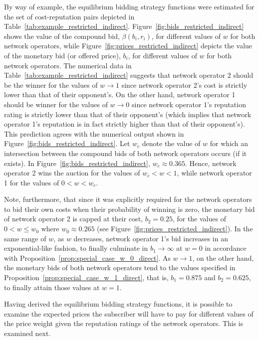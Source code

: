 By way of example, the equilibrium bidding strategy functions were estimated for the set of cost-reputation pairs depicted in Table~\ref{tab:example_restricted_indirect}. Figure~\ref{fig:bids_restricted_indirect} shows the value of the compound bid, $\beta(b_i,r_i)$, for different values of $w$ for both network operators, while Figure~\ref{fig:prices_restricted_indirect} depicts the value of the monetary bid (or offered price), $b_i$, for different values of $w$ for both network operators. The numerical data in Table~\ref{tab:example_restricted_indirect} suggests that network operator 2 should be the winner for the values of $w\rightarrow 1$ since network operator 2's cost is strictly lower than that of their opponent's. On the other hand, network operator 1 should be winner for the values of $w\rightarrow 0$ since network operator 1's reputation rating is strictly lower than that of their opponent's (which implies that network operator 1's reputation is in fact strictly higher than that of their opponent's). This prediction agrees with the numerical output shown in Figure~\ref{fig:bids_restricted_indirect}. Let $w_c$ denote the value of $w$ for which an intersection between the compound bids of both network operators occurs (if it exists). In Figure~\ref{fig:bids_restricted_indirect}, $w_c\approx 0.365$. Hence, network operator 2 wins the auction for the values of $w_c < w < 1$, while network operator 1 for the values of $0 < w < w_c$.

Note, furthermore, that since it was explicitly required for the network operators to bid their own costs when their probability of winning is zero, the monetary bid of network operator 2 is capped at their cost, $b_2 = 0.25$, for the values of $0 < w \le w_0$ where $w_0\approx 0.265$ (see Figure~\ref{fig:prices_restricted_indirect}). In the same range of $w$, as $w$ decreases, network operator 1's bid increases in an exponential-like fashion, to finally culminate in $b_1\to\infty$ at $w=0$ in accordance with Proposition~\ref{prop:special_case_w_0_direct}. As $w\to 1$, on the other hand, the monetary bids of both network operators tend to the values specified in Proposition~\ref{prop:special_case_w_1_direct}, that is, $b_1=0.875$ and $b_2=0.625$, to finally attain those values at $w=1$.

Having derived the equilibrium bidding strategy functions, it is possible to examine the expected prices the subscriber will have to pay for different values of the price weight given the reputation ratings of the network operators. This is examined next.

